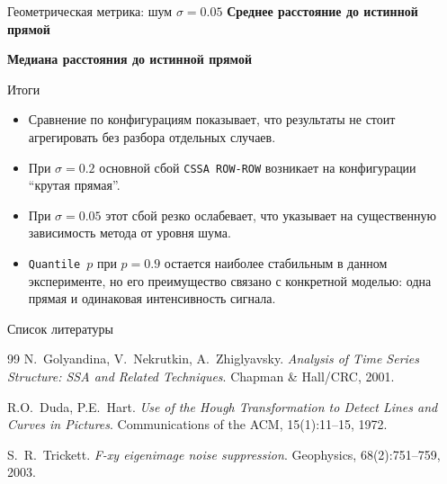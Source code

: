 \documentclass[unicode,notheorems]{beamer}
\begin{document}
\begin{frame}{Геометрическая метрика: шум $\sigma=0.05$}
	\scriptsize
	\centering
	\textbf{Среднее расстояние до истинной прямой}
	\par\vspace{0.06cm}
	{
	\renewcommand{\arraystretch}{0.9}
	\setlength{\tabcolsep}{2pt}
	\resizebox{\textwidth}{!}{}
	}

	\vspace{0.22cm}
	\textbf{Медиана расстояния до истинной прямой}
	\par\vspace{0.06cm}
	{
	\renewcommand{\arraystretch}{0.9}
	\setlength{\tabcolsep}{2pt}
	\resizebox{\textwidth}{!}{}
	}
\end{frame}

\begin{frame}{Итоги}
	\begin{itemize}
		\item Сравнение по конфигурациям показывает, что результаты не стоит агрегировать без разбора отдельных случаев.
		\item При $\sigma=0.2$ основной сбой \texttt{CSSA ROW-ROW} возникает на конфигурации ``крутая прямая''.
		\item При $\sigma=0.05$ этот сбой резко ослабевает, что указывает на существенную зависимость метода от уровня шума.
		\item \texttt{Quantile $p$} при $p=0.9$ остается наиболее стабильным в данном эксперименте, но его преимущество связано с конкретной моделью: одна прямая и одинаковая интенсивность сигнала.
	\end{itemize}
\end{frame}

\begin{frame}{Список литературы}
	\begin{thebibliography}{99}
		 N.~Golyandina, V.~Nekrutkin, A.~Zhiglyavsky.
		\textit{Analysis of Time Series Structure: SSA and Related Techniques}.
		Chapman \& Hall/CRC, 2001.

		 R.O.~Duda, P.E.~Hart.
		\textit{Use of the Hough Transformation to Detect Lines and Curves in Pictures}.
		Communications of the ACM, 15(1):11--15, 1972.

		 S.~R.~Trickett.
		\textit{F-xy eigenimage noise suppression}.
		Geophysics, 68(2):751--759, 2003.
	\end{thebibliography}
\end{frame}
\end{document}
